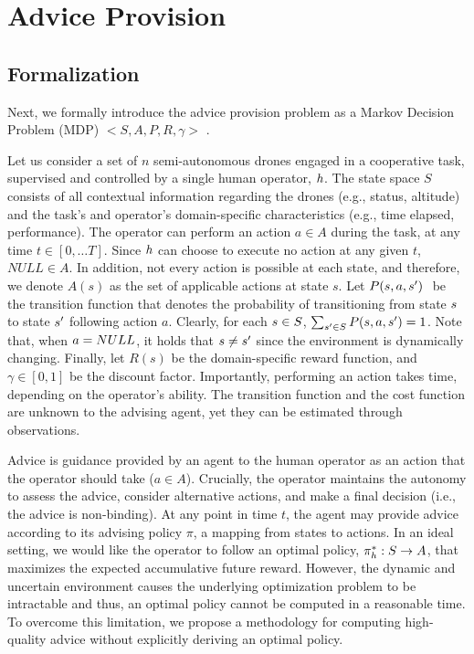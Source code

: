 \section{Advice Provision}
\label{sec:formal}

\subsection{Formalization}
Next, we formally introduce the advice provision problem as a Markov Decision Problem (MDP) $<S,A,P,R,\gamma>$ \cite{Puterman1994}.

Let us consider a set of $n$ semi-autonomous drones engaged in a cooperative task, supervised and controlled by a single human operator, $h$.
The state space $S$ consists of all contextual information regarding the drones (e.g., status, altitude) and the task's and operator's domain-specific characteristics (e.g., time elapsed, performance). The operator can perform an action $a\in A$ during the task, at any time $t\in [0,\ldots T]$. Since $h$ can choose to execute no action at any given $t$, $NULL\in A$. In addition, not every action is possible at each state, and therefore, we denote $A(s)$ as the set of applicable actions at state $s$.
Let $\Pfunc{\stateS}{\action}{\stateS'} \ $
be the transition function that denotes the probability of transitioning from state $s$ to state $s'$ following action $a$.
Clearly, for each $s \in S$, 
$\sum_{s' \in S} P(s, a, s')=1$.
Note that, when $a = NULL$, it holds that $s \not= s'$ since the environment is dynamically changing.  
Finally, let $R(s)$ be the domain-specific reward function,
and $\gamma\in[0,1]$ be the discount factor.
Importantly, performing an action takes time, depending on the operator's ability. The transition function and the cost function are unknown to the advising agent, yet they can be estimated through observations. %

Advice is guidance provided by an agent to the human operator as an action that the operator should take ($a \in A$). 
Crucially, the operator maintains the autonomy to assess the advice, consider alternative actions, and make a final decision (i.e., the advice is non-binding). At any point in time $t$, the agent may provide advice according to its advising policy $\pi$, a mapping from states to actions.
In an ideal setting, we would like the operator to follow an optimal policy, $\pi^*_{h}: S \rightarrow A$, that maximizes the expected accumulative future reward. However, the dynamic and uncertain environment causes the underlying optimization problem to be intractable and thus, an optimal policy cannot be computed in a reasonable time. To overcome this limitation, we propose a methodology for computing high-quality advice without explicitly deriving an optimal policy. 

